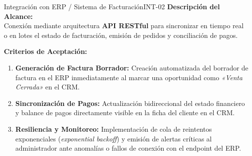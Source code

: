 \begin{IntegrationBox}{Integración con ERP / Sistema de Facturación}{INT-02}
    \sffamily
    \textbf{\textcolor{PrimaryNavy}{Descripción del Alcance:}}\\
    Conexión mediante arquitectura \textbf{API RESTful} para sincronizar en tiempo real o en lotes el estado de facturación, emisión de pedidos y conciliación de pagos.
    
    \vspace{0.2cm}
    \textbf{\textcolor{PrimaryNavy}{Criterios de Aceptación:}}
    \begin{enumerate}[label=\textbf{\arabic*.}]
        \item \textbf{Generación de Factura Borrador:} Creación automatizada del borrador de factura en el ERP inmediatamente al marcar una oportunidad como \textit{«Venta Cerrada»} en el CRM.
        \item \textbf{Sincronización de Pagos:} Actualización bidireccional del estado financiero y balance de pagos directamente visible en la ficha del cliente en el CRM.
        \item \textbf{Resiliencia y Monitoreo:} Implementación de cola de reintentos exponenciales (\textit{exponential backoff}) y emisión de alertas críticas al administrador ante anomalías o fallos de conexión con el endpoint del ERP.
    \end{enumerate}
\end{IntegrationBox}

